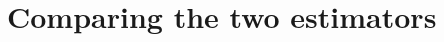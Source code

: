 \documentclass[journal]{IEEEtran}
\begin{document}

\section{Comparing the two estimators}\label{sec:comparingestimatorcircmean}
\end{document}
